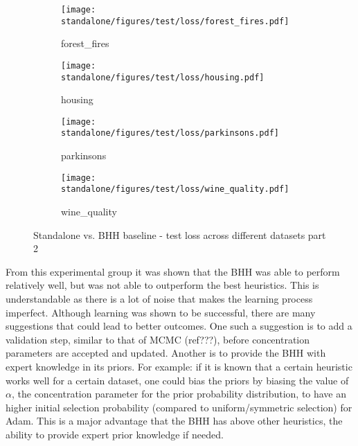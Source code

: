 \begin{figure}[htbp]
      \begin{subfigure}{0.48\textwidth}
            \centering
            \texttt{[image: standalone/figures/test/loss/forest\_fires.pdf]}
            \caption{forest\_fires}
            \label{fig:results:standalone:figures:test:loss:forest_fires}
      \end{subfigure}
      \begin{subfigure}{0.48\textwidth}
            \centering
            \texttt{[image: standalone/figures/test/loss/housing.pdf]}
            \caption{housing}
            \label{fig:results:standalone:figures:test:loss:housing}
      \end{subfigure}
      \begin{subfigure}{0.48\textwidth}
            \centering
            \texttt{[image: standalone/figures/test/loss/parkinsons.pdf]}
            \caption{parkinsons}
            \label{fig:results:standalone:figures:test:loss:parkinsons}
      \end{subfigure}
      \begin{subfigure}{0.48\textwidth}
            \centering
            \texttt{[image: standalone/figures/test/loss/wine\_quality.pdf]}
            \caption{wine\_quality}
            \label{fig:results:standalone:figures:test:loss:wine_quality}
      \end{subfigure}
      \caption{Standalone vs. \Acs{BHH} baseline - test loss across different datasets part 2}
      \label{fig:results:standalone:figures:test:loss:various2}
\end{figure}


From this experimental group it was shown that the \Ac{BHH} was able to perform relatively well, but was not able to outperform the best heuristics. This is understandable as there is a lot of noise that makes the learning process imperfect. Although learning was shown to be successful, there are many suggestions that could lead to better outcomes. One such a suggestion is to add a validation step, similar to that of \ac{MCMC} (ref???), before concentration parameters are accepted and updated. Another is to provide the \Ac{BHH} with expert knowledge in its priors. For example: if it is known that a certain heuristic works well for a certain dataset, one could bias the priors by biasing the value of  $\alpha$, the concentration parameter for the prior probability distribution, to have an higher initial selection probability (compared to uniform/symmetric selection) for \Ac{Adam}. This is a major advantage that the \Ac{BHH} has above other heuristics, the ability to provide expert prior knowledge if needed.

